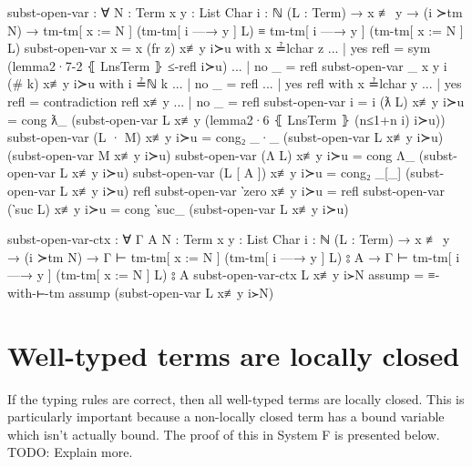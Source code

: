 \documentclass[logo,bsc,singlespacing,parskip,online]{infthesis}
\renewenvironment{code}{\mintedcopy[breaklines,breaksymbolleft=\;]{agda}}{\endmintedcopy}
\begin{document}
\begin{code}
  subst-open-var : ∀ {N : Term} {x y : List Char} {i : ℕ}
    (L : Term)
    → x ≢ y
    → (i ≻tm N)
    → tm-tm[ x := N ] (tm-tm[ i —→ y ] L)
      ≡ tm-tm[ i —→ y ] (tm-tm[ x := N ] L)
  subst-open-var {x = x} (fr z) x≢y i≻u with x ≟lchar z
  ... | yes refl = sym (lemma2·7-2 ⦃ LnsTerm ⦄ ≤-refl i≻u)
  ... | no  _    = refl
  subst-open-var {_} {x} {y} {i} (# k) x≢y i≻u with i ≟ℕ k
  ... | no  _ = refl
  ... | yes refl with x ≟lchar y
  ...    | yes refl = contradiction refl x≢y
  ...    | no  _    = refl
  subst-open-var {i = i} (ƛ L) x≢y i≻u = cong ƛ_
    (subst-open-var L x≢y (lemma2·6 ⦃ LnsTerm ⦄ (n≤1+n i) i≻u))
  subst-open-var (L · M) x≢y i≻u = cong₂ _·_
    (subst-open-var L x≢y i≻u) (subst-open-var M x≢y i≻u)
  subst-open-var (Λ L) x≢y i≻u =
    cong Λ_ (subst-open-var L x≢y i≻u)
  subst-open-var (L [ A ]) x≢y i≻u =
    cong₂ _[_] (subst-open-var L x≢y i≻u) refl
  subst-open-var ‵zero x≢y i≻u = refl
  subst-open-var (‵suc L) x≢y i≻u =
    cong ‵suc_ (subst-open-var L x≢y i≻u)

  subst-open-var-ctx : ∀ {Γ A} {N : Term} {x y : List Char} {i : ℕ}
    (L : Term)
    → x ≢ y
    → (i ≻tm N)
    → Γ ⊢ tm-tm[ x := N ] (tm-tm[ i —→ y ] L) ⦂ A
    → Γ ⊢ tm-tm[ i —→ y ] (tm-tm[ x := N ] L) ⦂ A
  subst-open-var-ctx L x≢y i≻N assump =
    ≡-with-⊢-tm assump (subst-open-var L x≢y i≻N)
\end{code}

\section{Well-typed terms are locally closed}
If the typing rules are correct, then all well-typed terms are locally closed. This is particularly
important because a non-locally closed term has a bound variable which isn't actually bound. The
proof of this in System F is presented below. TODO: Explain more.
\end{document}
